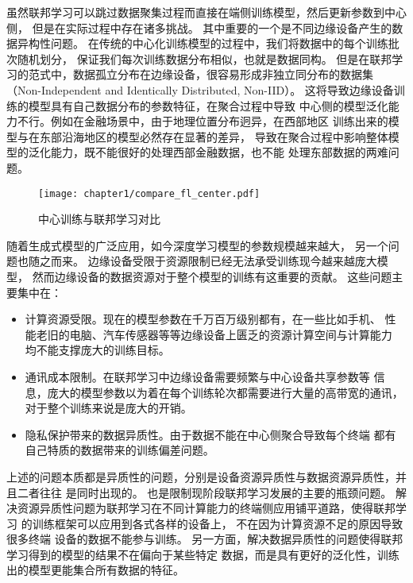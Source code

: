 虽然联邦学习可以跳过数据聚集过程而直接在端侧训练模型，然后更新参数到中心侧，
但是在实际过程中存在诸多挑战。
其中重要的一个是不同边缘设备产生的数据异构性问题。
在传统的中心化训练模型的过程中，我们将数据中的每个训练批次随机划分，
保证我们每次训练数据分布相似，也就是数据同构。
但是在联邦学习的范式中，数据孤立分布在边缘设备，很容易形成非独立同分布的数据集\cite{WXAQ202105007}
（Non-Independent and Identically Distributed, Non-IID）。
这将导致边缘设备训练的模型具有自己数据分布的参数特征\cite{li2020federated,li2022federated,huang2023stochastic}，在聚合过程中导致
中心侧的模型泛化能力不行。例如在金融场景中，由于地理位置分布迥异，在西部地区
训练出来的模型与在东部沿海地区的模型必然存在显著的差异，
导致在聚合过程中影响整体模型的泛化能力，既不能很好的处理西部金融数据，也不能
处理东部数据的两难问题。
\begin{figure}[htbp]
    \centering
    \texttt{[image: chapter1/compare\_fl\_center.pdf]}
    \caption{\label{fig:1-1compare_2methods}中心训练与联邦学习对比}
\end{figure}

随着生成式模型的广泛应用，如今深度学习模型的参数规模越来越大，
另一个问题也随之而来。
边缘设备受限于资源限制已经无法承受训练现今越来越庞大模型\cite{cai2020tinytl, lee2019intermittent, DBLP:journals/imwut/LiuCZLWL0C21,DBLP:conf/infocom/WangXFLZ23,gobieski2019intelligence}，
然而边缘设备的数据资源对于整个模型的训练有这重要的贡献。
这些问题主要集中在：
\begin{itemize}
    \item 计算资源受限\cite{cai2020tinytl,gobieski2019intelligence,lee2019intermittent}。现在的模型参数在千万百万级别都有，在一些比如手机、
    性能老旧的电脑、汽车传感器等等边缘设备上匮乏的资源计算空间与计算能力
    均不能支撑庞大的训练目标。
    \item 通讯成本限制\cite{WXAQ20241116001,JSJA2024061200B}。在联邦学习中边缘设备需要频繁与中心设备共享参数等
    信息，庞大的模型参数以为着在每个训练轮次都需要进行大量的高带宽的通讯，
    对于整个训练来说是庞大的开销。
    \item 隐私保护带来的数据异质性。由于数据不能在中心侧聚合导致每个终端
    都有自己特质的数据带来的训练偏差问题。
\end{itemize}

上述的问题本质都是异质性的问题，分别是设备资源异质性与数据资源异质性，并且二者往往
是同时出现的。
也是限制现阶段联邦学习发展的主要的瓶颈问题。
解决资源异质性问题为联邦学习在不同计算能力的终端侧应用铺平道路，使得联邦学习
的训练框架可以应用到各式各样的设备上，
不在因为计算资源不足的原因导致很多终端
设备的数据不能参与训练。
另一方面，解决数据异质性的问题使得联邦学习得到的模型的结果不在偏向于某些特定
数据，而是具有更好的泛化性，训练出的模型更能集合所有数据的特征。



